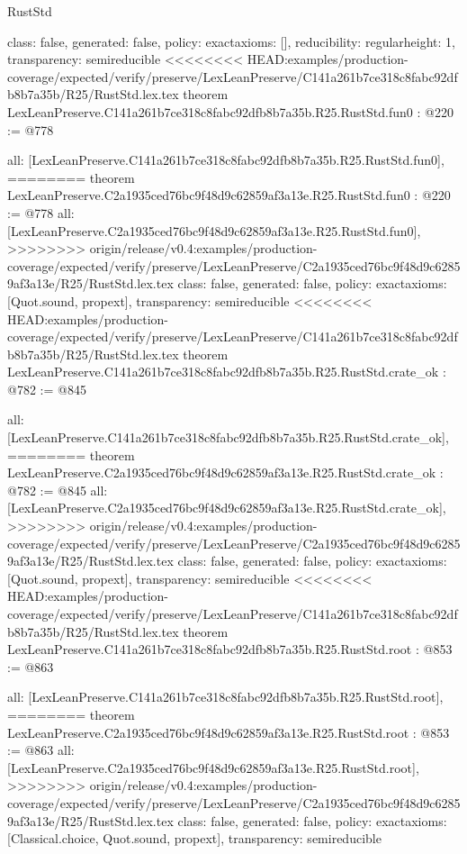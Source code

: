 \begin{lexlean}{RustStd}
\begin{coremodule}
{\begin{coremodule}
{{{  class: false,
  generated: false,
  policy: exact{axioms: []},
  reducibility: regular{height: 1},
  transparency: semireducible
}
<<<<<<<< HEAD:examples/production-coverage/expected/verify/preserve/LexLeanPreserve/C141a261b7ce318c8fabc92dfb8b7a35b/R25/RustStd.lex.tex
theorem LexLeanPreserve.C141a261b7ce318c8fabc92dfb8b7a35b.R25.RustStd.fun0 : @220 := @778 {
  all: [LexLeanPreserve.C141a261b7ce318c8fabc92dfb8b7a35b.R25.RustStd.fun0],
========
theorem LexLeanPreserve.C2a1935ced76bc9f48d9c62859af3a13e.R25.RustStd.fun0 : @220 := @778 {
  all: [LexLeanPreserve.C2a1935ced76bc9f48d9c62859af3a13e.R25.RustStd.fun0],
>>>>>>>> origin/release/v0.4:examples/production-coverage/expected/verify/preserve/LexLeanPreserve/C2a1935ced76bc9f48d9c62859af3a13e/R25/RustStd.lex.tex
  class: false,
  generated: false,
  policy: exact{axioms: [Quot.sound, propext]},
  transparency: semireducible
}
<<<<<<<< HEAD:examples/production-coverage/expected/verify/preserve/LexLeanPreserve/C141a261b7ce318c8fabc92dfb8b7a35b/R25/RustStd.lex.tex
theorem LexLeanPreserve.C141a261b7ce318c8fabc92dfb8b7a35b.R25.RustStd.crate_ok : @782 := @845 {
  all: [LexLeanPreserve.C141a261b7ce318c8fabc92dfb8b7a35b.R25.RustStd.crate_ok],
========
theorem LexLeanPreserve.C2a1935ced76bc9f48d9c62859af3a13e.R25.RustStd.crate_ok : @782 := @845 {
  all: [LexLeanPreserve.C2a1935ced76bc9f48d9c62859af3a13e.R25.RustStd.crate_ok],
>>>>>>>> origin/release/v0.4:examples/production-coverage/expected/verify/preserve/LexLeanPreserve/C2a1935ced76bc9f48d9c62859af3a13e/R25/RustStd.lex.tex
  class: false,
  generated: false,
  policy: exact{axioms: [Quot.sound, propext]},
  transparency: semireducible
}
<<<<<<<< HEAD:examples/production-coverage/expected/verify/preserve/LexLeanPreserve/C141a261b7ce318c8fabc92dfb8b7a35b/R25/RustStd.lex.tex
theorem LexLeanPreserve.C141a261b7ce318c8fabc92dfb8b7a35b.R25.RustStd.root : @853 := @863 {
  all: [LexLeanPreserve.C141a261b7ce318c8fabc92dfb8b7a35b.R25.RustStd.root],
========
theorem LexLeanPreserve.C2a1935ced76bc9f48d9c62859af3a13e.R25.RustStd.root : @853 := @863 {
  all: [LexLeanPreserve.C2a1935ced76bc9f48d9c62859af3a13e.R25.RustStd.root],
>>>>>>>> origin/release/v0.4:examples/production-coverage/expected/verify/preserve/LexLeanPreserve/C2a1935ced76bc9f48d9c62859af3a13e/R25/RustStd.lex.tex
  class: false,
  generated: false,
  policy: exact{axioms: [Classical.choice, Quot.sound, propext]},
  transparency: semireducible
}

}}}}}
\end{coremodule}}
\end{coremodule}
\end{lexlean}
